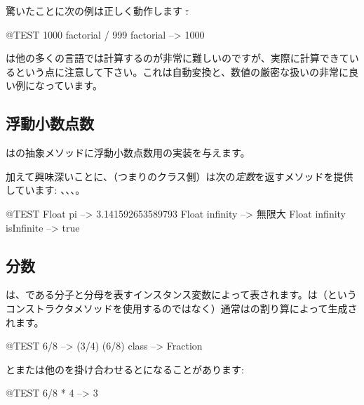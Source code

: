 \documentclass[a4paper,10pt,twoside]{book}
\begin{document}
驚いたことに次の例は正しく動作します \st:
\begin{code}{@TEST}
1000 factorial / 999 factorial --> 1000
\end{code}
は他の多くの言語では計算するのが非常に難しいのですが、実際に計算できているという点に注意して下さい。これは自動変換と、数値の厳密な扱いの非常に良い例になっています。


\subsection{浮動小数点数}

はの抽象メソッドに浮動小数点数用の実装を与えます。

加えて興味深いことに、（\ie つまりのクラス側）は次の\emph{定数}を返すメソッドを提供しています: 、、、。

\begin{code}{@TEST}
Float pi                      --> 3.141592653589793
Float infinity               --> 無限大
Float infinity isInfinite --> true
\end{code}

\subsection{分数}

は、である分子と分母を表すインスタンス変数によって表されます。は（というコンストラクタメソッドを使用するのではなく）通常はの割り算によって生成されます。

\begin{code}{@TEST}
6/8             --> (3/4)
(6/8) class --> Fraction
\end{code}

とまたは他のを掛け合わせるとになることがあります:

\begin{code}{@TEST}
6/8 * 4 --> 3
\end{code}
\end{document}
